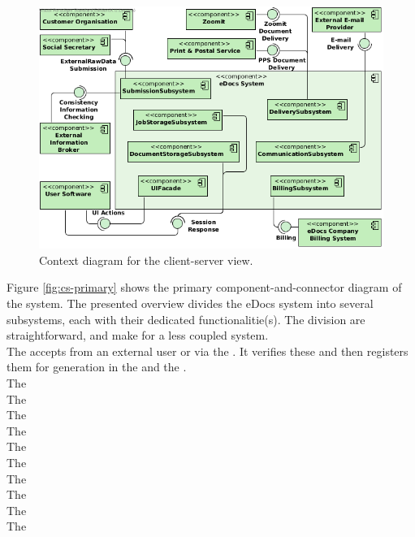 \begin{figure}[!htp]
    \centering
    \includegraphics[width=\textwidth]{figures/Context Diagram 1.png}
    \caption{Context diagram for the client-server view.}\label{fig:cc-context}
\end{figure}

Figure \ref{fig:cs-primary} shows the primary component-and-connector diagram of the system. The presented overview divides the eDocs system into several subsystems, each with their dedicated functionalitie(s). The division are straightforward, and make for a less coupled system.\\
The  accepts  from an external user or via the . It verifies these  and then registers them for generation in the  and the .\\
The  \\
The  \\
The  \\
The  \\
The  \\
The  \\
The  \\
The  \\
The  \\
The  \\

